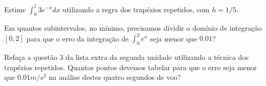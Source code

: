 \begin{ex}
Estime $\int_0^1 3e^{-x}dx$ utilizando a regra dos trapézios repetidos, com $h=1/5$.
\end{ex}


\begin{ex}
Em quantos subintervalos, no mínimo, precisamos dividir o domínio de integração $[0,2]$ para que o erro da integração de $\int_0^{2}e^x$ seja menor que $0.01$?
\end{ex}

\begin{ex}
Refaça a questão 3 da lista extra da segunda unidade utilizando a técnica dos trapézios repetidos. Quantos pontos devemos tabelar para que o erro seja menor que $0.01 m/s^2$ na análise destes quatro segundos de voo?
\end{ex}

%
%